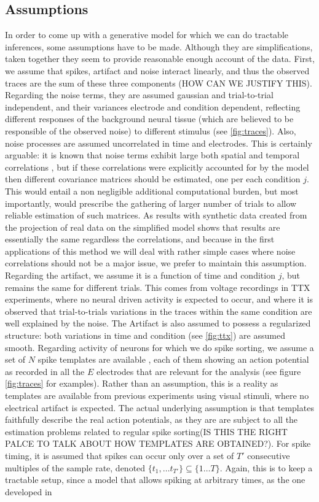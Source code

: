 \documentclass[12pt,letterpaper,fleqn]{article}
\begin{document}
\subsection{Assumptions}
In order to come up with a generative model for which we can do tractable inferences, some assumptions have to be made. Although they are simplifications, taken together they seem to provide reasonable enough account of the data. First, we assume that spikes, artifact and noise interact linearly, and thus the observed traces are the sum of these three components (HOW CAN WE JUSTIFY THIS). Regarding the noise terms, they are assumed gaussian and trial-to-trial independent, and their variances electrode and condition dependent, reflecting different responses of the background neural tissue (which are believed to be responsible of the observed noise) to different stimulus (see \ref{fig:traces}). Also, noise processes are assumed uncorrelated in time and electrodes. This is certainly arguable: it is known that noise terms exhibit large both spatial and temporal correlations \cite{PillowEtal13}, but if these correlations were explicitly accounted for by the model then different covariance matrices should be estimated, one per each condition $j$. This would entail a non negligible additional computational burden, but most importantly, would prescribe the gathering of larger number of trials to allow reliable estimation of such matrices. As results with synthetic data created from the projection of real data on the simplified model shows that results are essentially the same regardless the correlations, and because in the first applications of this method we will deal with rather simple cases where noise correlations should not be a major issue, we prefer to maintain this assumption. Regarding the artifact, we assume it is a function of time and condition $j$, but remains the same for different trials. This comes from voltage recordings in TTX experiments, where no neural driven activity is expected to occur, and where it is observed that trial-to-trials variations in the traces within the same condition are well explained by the noise. The Artifact is also assumed to possess a regularized structure: both variations in time and condition (see \ref{fig:ttx}) are assumed smooth. Regarding activity of neurons for which we do spike sorting, we assume a set of $N$ spike templates are available , each of them showing an action potential as recorded in all the $E$ electrodes that are relevant for the analysis (see figure  \ref{fig:traces} for examples). Rather than an assumption, this is a reality as templates are available from previous experiments using visual stimuli, where no electrical artifact is expected. The actual underlying assumption is that templates faithfully describe the real action potentials, as they are are subject to all the estimation problems related to regular spike sorting(IS THIS THE RIGHT PALCE TO TALK ABOUT HOW TEMPLATES ARE OBTAINED?). For spike timing, it is assumed that spikes can occur only over a set of $T'$ consecutive multiples of the sample rate, denoted $\{t_1,\ldots t_{T'}\}\subseteq \{1\ldots T\}$. Again, this is to keep a tractable setup, since a model that allows spiking at arbitrary times, as the one developed in 
\end{document}
